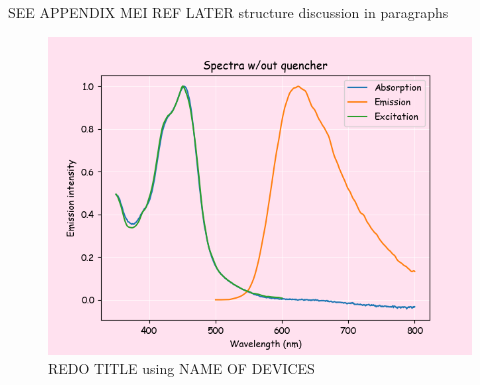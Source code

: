 SEE APPENDIX MEI REF LATER
structure discussion in paragraphs

\begin{figure}[H]
    \centering
    \includegraphics[width = 0.7\linewidth]{part1_noq.png}
    \caption{REDO TITLE using NAME OF DEVICES}
    \label{fig:part1_noq}
\end{figure}
